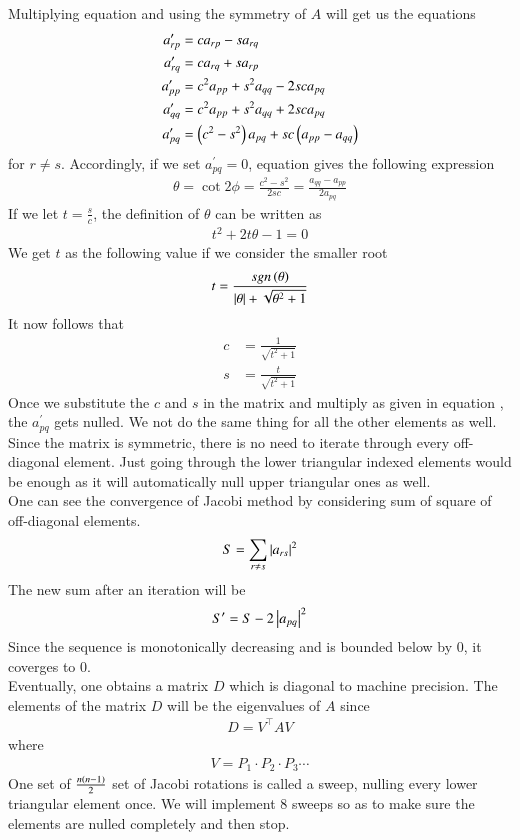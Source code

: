 \documentclass[a4paper,12pt]{article}
\theoremstyle{remark}
\begin{document}
Multiplying equation  and using the symmetry of $A$ will get us the equations
\begin{align}
a_{rp}^\prime &= ca_{rp} - sa_{rq}\\
a_{rq}^\prime &= ca_{rq} + sa_{rp}\\
a_{pp}^\prime &= c^2a_{pp} + s^2a_{qq} - 2sca_{pq}\\
a_{qq}^\prime &= c^2a_{pp} + s^2a_{qq} + 2sca_{pq}\\
a_{pq}^\prime &= \left(c^2-s^2\right)a_{pq} +sc\left(a_{pp}-a_{qq}\right) 
\end{align}
for $r \neq s$. Accordingly, if we set $a_{pq}^\prime = 0$, equation  gives the following expression
\begin{align}
	\theta = \cot{2\phi} = \frac{c^2-s^2}{2sc} = \frac{a_{qq}-a_{pp}}{2a_{pq}}
\end{align}
If we let $t = \frac{s}{c}$, the definition of $\theta$ can be written as 
\begin{align}
	t^2+2t\theta - 1=0
\end{align}
We get $t$ as the following value if we consider the smaller root
\begin{align}
	t = \frac{sgn\left(\theta\right)}{\left\vert\theta\right\vert+\sqrt{\theta^2+1}}
\end{align}
It now follows that 
\begin{align}
	c&=\frac{1}{\sqrt{t^2+1}}\\
	s&=\frac{t}{\sqrt{t^2+1}}
\end{align}
Once we substitute the $c$ and $s$ in the matrix and multiply as given in equation , the $a_{pq}^\prime$ gets nulled. We not do the same thing for all the other elements as well. Since the matrix is symmetric, there is no need to iterate through every off-diagonal element. Just going through the lower triangular indexed elements would be enough as it will automatically null upper triangular ones as well.\\
One can see the convergence of Jacobi method by considering sum of square of off-diagonal elements.
\begin{align}
	S = \sum_{r\neq s}\left\vert a_{rs}\right\vert^2
\end{align}
The new sum after an iteration will be
\begin{align}
	S^\prime = S - 2\left\vert a_{pq}\right\vert^2 
\end{align}
Since the sequence is monotonically decreasing and is bounded below by 0, it coverges to 0.\\
Eventually, one obtains a matrix $D$ which is diagonal to machine precision. The elements of the matrix $D$ will be the eigenvalues of $A$ since
\begin{align}
	D = V^\top A V
\end{align}
where
\begin{align}
	V = P_1\cdot P_2\cdot P_3 \cdots 
\end{align}
One set of $\frac{n\left(n-1\right)}{2}$ set of Jacobi rotations is called a sweep, nulling every lower triangular element once. We will implement 8 sweeps so as to make sure the elements are nulled completely and then stop.
\end{document}
